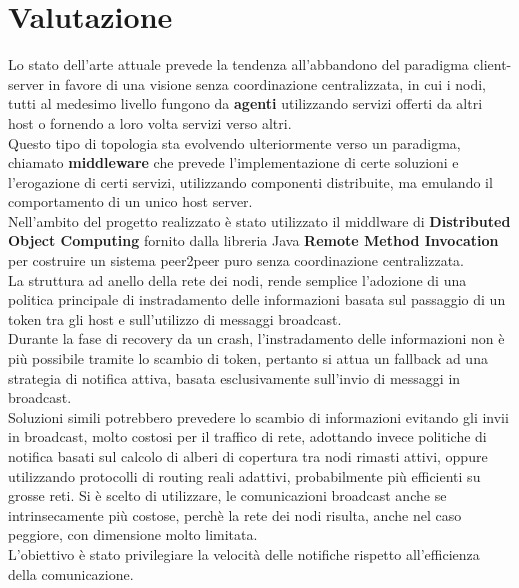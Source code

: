\documentclass[10pt,a4paper]{article}
\begin{document}



\section{Valutazione}
Lo stato dell'arte attuale prevede la tendenza all'abbandono del paradigma client-server in favore di una visione senza coordinazione centralizzata, in cui i nodi, tutti al medesimo livello fungono da \textbf{agenti} utilizzando servizi offerti da altri host o fornendo a loro volta servizi verso altri.\\ Questo tipo di topologia sta evolvendo ulteriormente verso un paradigma, chiamato \textbf{middleware} che prevede l'implementazione di certe soluzioni e l'erogazione di certi servizi, utilizzando componenti distribuite, ma emulando il comportamento di un unico host server. \\ Nell'ambito del progetto realizzato è stato utilizzato il middlware di \textbf{Distributed Object Computing} fornito dalla libreria Java \textbf{Remote Method Invocation} per costruire un sistema peer2peer puro senza coordinazione centralizzata.\\La struttura ad anello della rete dei nodi, rende semplice l'adozione di una politica principale di instradamento delle informazioni basata sul passaggio di un token tra gli host e sull'utilizzo di messaggi broadcast.\\ Durante la fase di recovery da un crash, l'instradamento delle informazioni non è più possibile tramite lo scambio di token, pertanto si attua un fallback ad una strategia di notifica attiva, basata esclusivamente sull'invio di messaggi in broadcast.\\ Soluzioni simili potrebbero prevedere lo scambio di informazioni evitando gli invii in broadcast, molto costosi per il traffico di rete, adottando invece politiche di notifica basati sul calcolo di alberi di copertura tra nodi rimasti attivi, oppure utilizzando protocolli di routing reali adattivi, probabilmente più efficienti su grosse reti. Si è scelto di utilizzare, le comunicazioni broadcast anche se intrinsecamente più costose, perchè la rete dei nodi risulta, anche nel caso peggiore, con dimensione molto limitata.\\ L'obiettivo è stato privilegiare la velocità delle notifiche rispetto all'efficienza della comunicazione. 
\end{document}
